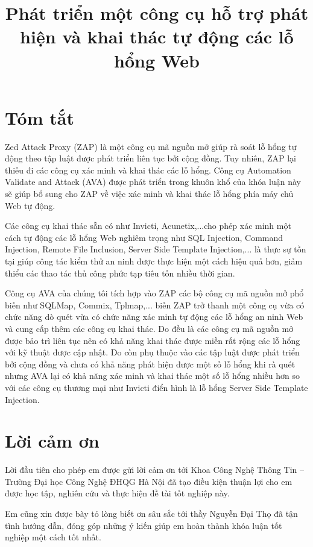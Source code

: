 \documentclass[12pt,a4paper]{report}
\title{Phát triển một công cụ hỗ trợ phát hiện và khai thác tự động các lỗ hổng Web}
\begin{document}

\clearpage{}

\chapter*{Tóm tắt}

Zed Attack Proxy (ZAP) là một công cụ mã nguồn mở giúp rà soát lỗ hổng tự động theo tập luật
được phát triển liên tục bởi cộng đồng. Tuy nhiên, ZAP lại thiếu đi các công cụ xác minh và
khai thác các lỗ hổng. Công cụ Automation Validate and Attack (AVA) được phát triển trong
khuôn khổ của khóa luận này sẽ giúp bổ sung cho ZAP về việc xác minh và khai thác lỗ hổng
phía máy chủ Web tự động.

Các công cụ khai thác sẵn có như Invicti, Acunetix,...cho phép xác minh một cách tự động các
lỗ hổng Web nghiêm trọng như SQL Injection, Command Injection, Remote File Inclusion,
Server Side Template Injection,... là thực sự tồn tại giúp công tác kiểm thử an ninh được thực
hiện một cách hiệu quả hơn, giảm thiểu các thao tác thủ công phức tạp tiêu tốn nhiều thời gian.

Công cụ AVA của chúng tôi tích hợp vào ZAP các bộ công cụ mã nguồn mở phổ biến như SQLMap,
Commix, Tplmap,... biến ZAP trở thanh một công cụ vừa có chức năng dò quét vừa có chức năng
xác minh tự động các lỗ hổng an ninh Web và cung cấp thêm các công cụ khai thác. Do đều là các
công cụ mã nguồn mở được bảo trì liên tục nên có khả năng khai thác được miền rất rộng các
lỗ hổng với kỹ thuật được cập nhật. Do còn phụ thuộc vào các tập luật được phát triển bởi cộng
đồng và chưa có khả năng phát hiện được một số lỗ hổng khi rà quét nhưng AVA lại có khả năng xác
minh và khai thác một số lỗ hổng nhiều hơn so với các công cụ thương mại như Invicti điển hình
là lỗ hổng Server Side Template Injection.


\chapter*{Lời cảm ơn}

Lời đầu tiên cho phép em được gửi lời cảm ơn tới Khoa Công Nghệ Thông Tin – Trường Đại học Công
Nghệ ĐHQG Hà Nội đã tạo điều kiện thuận lợi cho em được học tập, nghiên cứu và thực hiện
đề tài tốt nghiệp này.

Em cũng xin được bày tỏ lòng biết ơn sâu sắc tới thầy Nguyễn Đại Thọ đã tận tình hướng dẫn,
đóng góp những ý kiến giúp em hoàn thành khóa luận tốt nghiệp một cách tốt nhất.
\end{document}
